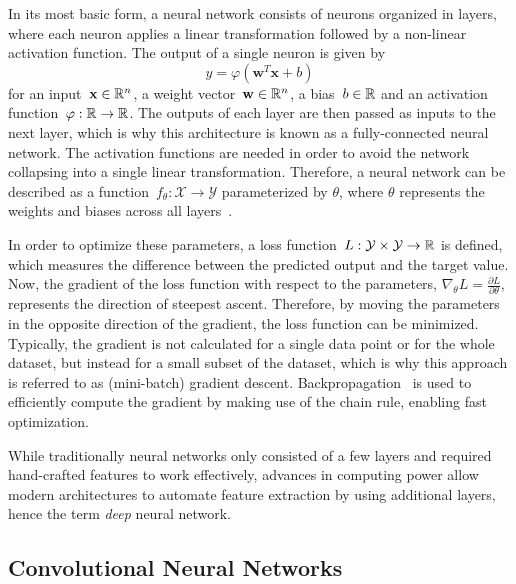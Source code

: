 In its most basic form, a neural network consists of neurons organized in layers, where each neuron applies a linear transformation followed by a non-linear activation function.
The output of a single neuron is given by
\begin{equation}
    y = \varphi(\mathbf{w}^T\mathbf{x} + b)
\end{equation}
for an input~$\mathbf{x} \in \mathbb{R}^n$, a weight vector~$\mathbf{w} \in \mathbb{R}^n$, a bias~$b \in \mathbb{R}$ and an activation function~$\varphi: \mathbb{R} \rightarrow \mathbb{R}$.
The outputs of each layer are then passed as inputs to the next layer, which is why this architecture is known as a fully-connected neural network. 
The activation functions are needed in order to avoid the network collapsing into a single linear transformation. 
Therefore, a neural network can be described as a function~$f_{\theta}: \mathcal{X} \rightarrow \mathcal{Y}$ parameterized by $\theta$, where $\theta$ represents the weights and biases across all layers~\cite{DeepLearning}.

In order to optimize these parameters, a loss function~$L: \mathcal{Y} \times \mathcal{Y} \rightarrow \mathbb{R}$ is defined, which measures the difference between the predicted output and the target value. 
Now, the gradient of the loss function with respect to the parameters, $\nabla_\theta L = \frac{\partial L}{\partial \theta}$, represents the direction of steepest ascent.
Therefore, by moving the parameters in the opposite direction of the gradient, the loss function can be minimized.
Typically, the gradient is not calculated for a single data point or for the whole dataset, but instead for a small subset of the dataset, which is why this approach is referred to as (mini-batch) gradient descent.
Backpropagation~\cite{Backpropagation} is used to efficiently compute the gradient by making use of the chain rule, enabling fast optimization.

While traditionally neural networks only consisted of a few layers and required hand-crafted features to work effectively, advances in computing power allow modern architectures to automate feature extraction by using additional layers, hence the term \textit{deep} neural network.

\subsection{Convolutional Neural Networks}

